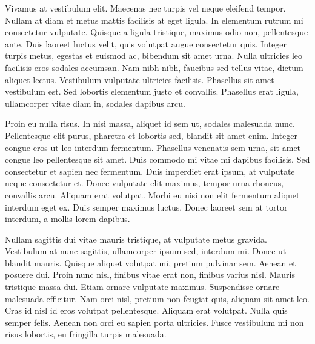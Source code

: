 \documentclass{book}
\begin{document}
            Vivamus at vestibulum elit. Maecenas nec turpis vel neque eleifend tempor. Nullam at
               diam et metus mattis facilisis at eget ligula. In elementum rutrum mi consectetur
               vulputate. Quisque a ligula tristique, maximus odio non, pellentesque ante. Duis
               laoreet luctus velit, quis volutpat augue consectetur quis. Integer turpis metus,
               egestas et euismod ac, bibendum sit amet urna. Nulla ultricies leo facilisis eros
               sodales accumsan. Nam nibh nibh, faucibus sed tellus vitae, dictum aliquet lectus.
               Vestibulum vulputate ultricies facilisis. Phasellus sit amet vestibulum est. Sed
               lobortis elementum justo et convallis. Phasellus erat ligula, ullamcorper vitae diam
               in, sodales dapibus arcu.

            Proin eu nulla risus. In nisi massa, aliquet id sem ut, sodales malesuada nunc.
               Pellentesque elit purus, pharetra et lobortis sed, blandit sit amet enim. Integer
               congue eros ut leo interdum fermentum. Phasellus venenatis sem urna, sit amet congue
               leo pellentesque sit amet. Duis commodo mi vitae mi dapibus facilisis. Sed
               consectetur et sapien nec fermentum. Duis imperdiet erat ipsum, at vulputate neque
               consectetur et. Donec vulputate elit maximus, tempor urna rhoncus, convallis arcu.
               Aliquam erat volutpat. Morbi eu nisi non elit fermentum aliquet interdum eget ex.
               Duis semper maximus luctus. Donec laoreet sem at tortor interdum, a mollis lorem
               dapibus.

            Nullam sagittis dui vitae mauris tristique, at vulputate metus gravida. Vestibulum at
               nunc sagittis, ullamcorper ipsum sed, interdum mi. Donec ut blandit mauris. Quisque
               aliquet volutpat mi, pretium pulvinar sem. Aenean et posuere dui. Proin nunc nisl,
               finibus vitae erat non, finibus varius nisl. Mauris tristique massa dui. Etiam ornare
               vulputate maximus. Suspendisse ornare malesuada efficitur. Nam orci nisl, pretium non
               feugiat quis, aliquam sit amet leo. Cras id nisl id eros volutpat pellentesque.
               Aliquam erat volutpat. Nulla quis semper felis. Aenean non orci eu sapien porta
               ultricies. Fusce vestibulum mi non risus lobortis, eu fringilla turpis malesuada.
\end{document}
